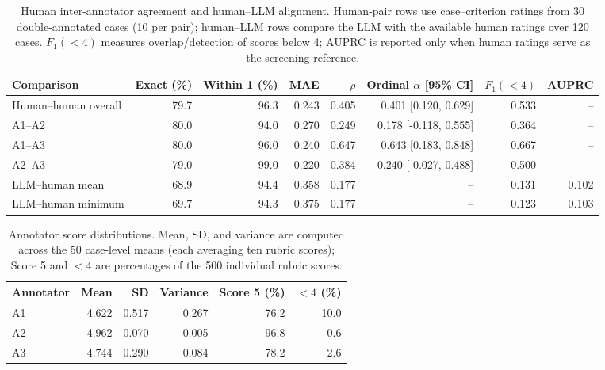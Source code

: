 \begin{table}[t]
\centering
\scriptsize
\setlength{\tabcolsep}{4pt}
\caption{Human inter-annotator agreement and human--LLM alignment. Human-pair rows use case--criterion ratings from 30 double-annotated cases (10 per pair); human--LLM rows compare the LLM with the available human ratings over 120 cases. $F_1(<4)$ measures overlap/detection of scores below 4; AUPRC is reported only when human ratings serve as the screening reference.}
\label{tab:annotation_alignment}
\begin{tabular}{@{}lrrrrrrr@{}}
\toprule
Comparison & Exact (\%) & Within 1 (\%) & MAE & $\rho$ & Ordinal $\alpha$ [95\% CI] & $F_1(<4)$ & AUPRC \\
\midrule
Human--human overall & 79.7 & 96.3 & 0.243 & 0.405 & 0.401 [0.120, 0.629] & 0.533 & -- \\
A1--A2 & 80.0 & 94.0 & 0.270 & 0.249 & 0.178 [-0.118, 0.555] & 0.364 & -- \\
A1--A3 & 80.0 & 96.0 & 0.240 & 0.647 & 0.643 [0.183, 0.848] & 0.667 & -- \\
A2--A3 & 79.0 & 99.0 & 0.220 & 0.384 & 0.240 [-0.027, 0.488] & 0.500 & -- \\
\midrule
LLM--human mean & 68.9 & 94.4 & 0.358 & 0.177 & -- & 0.131 & 0.102 \\
LLM--human minimum & 69.7 & 94.3 & 0.375 & 0.177 & -- & 0.123 & 0.103 \\
\bottomrule
\end{tabular}
\end{table}

\begin{table}[t]
\centering
\footnotesize
\setlength{\tabcolsep}{4pt}
\caption{Annotator score distributions. Mean, SD, and variance are computed across the 50 case-level means (each averaging ten rubric scores); Score 5 and $<4$ are percentages of the 500 individual rubric scores.}
\label{tab:annotator_distributions}
\begin{tabular}{@{}lrrrrr@{}}
\toprule
Annotator & Mean & SD & Variance & Score 5 (\%) & $<4$ (\%) \\
\midrule
A1 & 4.622 & 0.517 & 0.267 & 76.2 & 10.0 \\
A2 & 4.962 & 0.070 & 0.005 & 96.8 & 0.6 \\
A3 & 4.744 & 0.290 & 0.084 & 78.2 & 2.6 \\
\bottomrule
\end{tabular}
\end{table}
